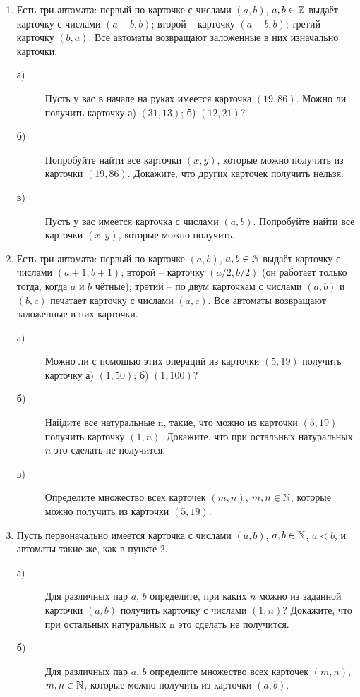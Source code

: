 \begin{enumerate}
\item Есть три автомата: первый по карточке с числами $(a, b)$, $a, b \in \mathbb{Z}$ выдаёт карточку с числами $(a - b, b)$; второй – карточку $(a + b, b)$; третий – карточку $(b, a)$. Все автоматы возвращают заложенные в них изначально карточки.
    \begin{description}
    \item [а) ]Пусть у вас в начале на руках имеется карточка $(19, 86)$. Можно ли получить карточку а) $(31,13)$; б) $(12, 21)$?
    \item [б) ]Попробуйте найти все карточки $(x, y)$, которые можно получить из карточки $(19, 86)$. Докажите, что других карточек получить нельзя.
    \item [в) ]Пусть у вас имеется карточка с числами $(a, b)$. Попробуйте найти все карточки $(x, y)$, которые можно получить.
    \end{description}
 \item Есть три автомата: первый по карточке $(a, b)$, $a, b \in \mathbb{N}$ выдаёт карточку с числами $(a + 1, b + 1)$; второй – карточку $(a/2,b/2)$ (он работает только тогда, когда $a$ и $b$ чётные); третий – по двум карточкам с числами $(a, b)$ и $(b, c)$ печатает карточку с числами $(a, c)$. Все автоматы возвращают заложенные в них карточки.
     \begin{description}
    \item [а) ]Можно ли с помощью этих операций из карточки $(5, 19)$ получить карточку а) $(1,50)$; б) $(1, 100)$?
    \item [б) ]Найдите все натуральные n, такие, что можно из карточки $(5, 19)$ получить карточку $(1, n)$. Докажите, что при остальных натуральных $n$ это сделать не получится.
    \item [в) ]Определите множество всех карточек $(m, n)$, $m, n \in \mathbb{N}$, которые можно получить из карточки $(5, 19)$.
    \end{description}
 \item Пусть первоначально имеется карточка с числами $(a, b)$, $a, b \in \mathbb{N}$, $a < b$, и автоматы такие же, как в пункте 2.
 \begin{description}
    \item [а) ]Для различных пар $a$, $b$ определите, при каких $n$ можно из заданной карточки $(a, b)$ получить карточку с числами $(1, n)$? Докажите, что при остальных натуральных n это сделать не получится.
    \item [б) ]Для различных пар $a$, $b$ определите множество всех карточек $(m, n)$, $m, n \in \mathbb{N}$, которые можно получить из карточки $(a, b)$.

\end{description}
\end{enumerate}
